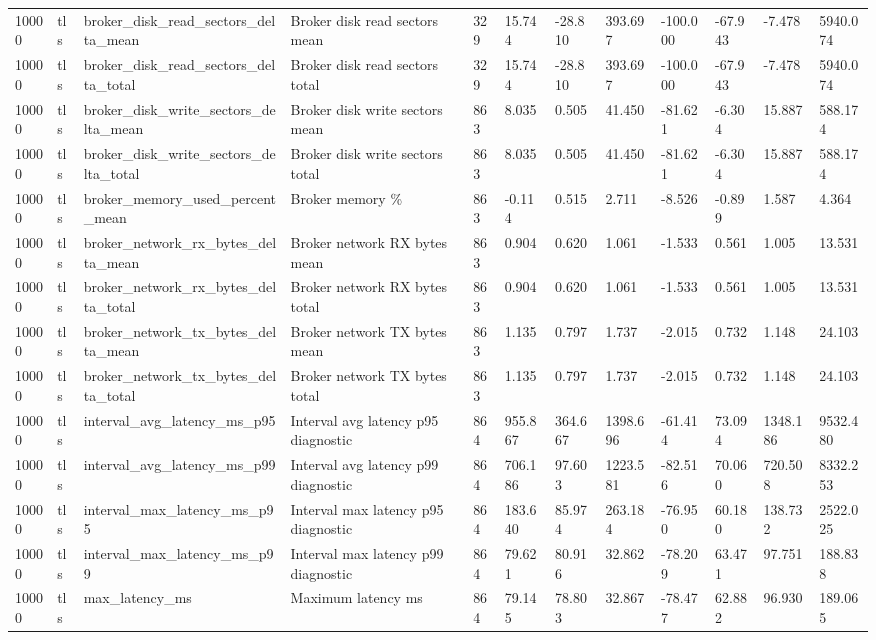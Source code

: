 \begin{longtable}{llllllllllll}
10000 & tls & broker\_disk\_read\_sectors\_delta\_mean & Broker disk read sectors mean & 329 & 15.744 & -28.810 & 393.697 & -100.000 & -67.943 & -7.478 & 5940.074 \\
10000 & tls & broker\_disk\_read\_sectors\_delta\_total & Broker disk read sectors total & 329 & 15.744 & -28.810 & 393.697 & -100.000 & -67.943 & -7.478 & 5940.074 \\
10000 & tls & broker\_disk\_write\_sectors\_delta\_mean & Broker disk write sectors mean & 863 & 8.035 & 0.505 & 41.450 & -81.621 & -6.304 & 15.887 & 588.174 \\
10000 & tls & broker\_disk\_write\_sectors\_delta\_total & Broker disk write sectors total & 863 & 8.035 & 0.505 & 41.450 & -81.621 & -6.304 & 15.887 & 588.174 \\
10000 & tls & broker\_memory\_used\_percent\_mean & Broker memory \% & 863 & -0.114 & 0.515 & 2.711 & -8.526 & -0.899 & 1.587 & 4.364 \\
10000 & tls & broker\_network\_rx\_bytes\_delta\_mean & Broker network RX bytes mean & 863 & 0.904 & 0.620 & 1.061 & -1.533 & 0.561 & 1.005 & 13.531 \\
10000 & tls & broker\_network\_rx\_bytes\_delta\_total & Broker network RX bytes total & 863 & 0.904 & 0.620 & 1.061 & -1.533 & 0.561 & 1.005 & 13.531 \\
10000 & tls & broker\_network\_tx\_bytes\_delta\_mean & Broker network TX bytes mean & 863 & 1.135 & 0.797 & 1.737 & -2.015 & 0.732 & 1.148 & 24.103 \\
10000 & tls & broker\_network\_tx\_bytes\_delta\_total & Broker network TX bytes total & 863 & 1.135 & 0.797 & 1.737 & -2.015 & 0.732 & 1.148 & 24.103 \\
10000 & tls & interval\_avg\_latency\_ms\_p95 & Interval avg latency p95 diagnostic & 864 & 955.867 & 364.667 & 1398.696 & -61.414 & 73.094 & 1348.186 & 9532.480 \\
10000 & tls & interval\_avg\_latency\_ms\_p99 & Interval avg latency p99 diagnostic & 864 & 706.186 & 97.603 & 1223.581 & -82.516 & 70.060 & 720.508 & 8332.253 \\
10000 & tls & interval\_max\_latency\_ms\_p95 & Interval max latency p95 diagnostic & 864 & 183.640 & 85.974 & 263.184 & -76.950 & 60.180 & 138.732 & 2522.025 \\
10000 & tls & interval\_max\_latency\_ms\_p99 & Interval max latency p99 diagnostic & 864 & 79.621 & 80.916 & 32.862 & -78.209 & 63.471 & 97.751 & 188.838 \\
10000 & tls & max\_latency\_ms & Maximum latency ms & 864 & 79.145 & 78.803 & 32.867 & -78.477 & 62.882 & 96.930 & 189.065 \\

\end{longtable}
